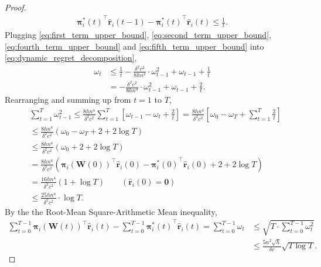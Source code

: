 \documentclass[10pt]{article}
\def\rvr{{\mathbf{r}}}
\def\rvzero{{\mathbf{0}}}
\def\rvpi{{\boldsymbol{\pi}}}
\def\rmW{{\mathbf{W}}}
\begin{document}
\begin{proof}
\begin{equation}
\label{eq:fifth_term_upper_bound}
\begin{split}
    {\rvpi_i^*(t)}^\top \hat{\rvr}_i(t-1) - {\rvpi_i^*(t)}^\top \hat{\rvr}_i(t) \le \frac{1}{t}.
\end{split}
\end{equation}
Plugging \cref{eq:first_term_upper_bound}, \cref{eq:second_term_upper_bound}, \cref{eq:fourth_term_upper_bound} and \cref{eq:fifth_term_upper_bound} into \cref{eq:dynamic_regret_decomposition},
\begin{equation*}
\begin{split}
    \omega_t &\le \frac{1}{t} - \frac{\delta^2 c^2}{8 h n^4} \cdot \omega_{t-1}^2 + \omega_{t-1} + \frac{1}{t} \\
    &= - \frac{\delta^2 c^2}{8 h n^4} \cdot \omega_{t-1}^2 + \omega_{t-1} + \frac{2}{t}.
\end{split}
\end{equation*}
Rearranging and summing up from $t = 1$ to $T$,
\begin{equation*}
\begin{split}
    &\sum\limits_{t=1}^{T}{ \omega_{t-1}^2 } \le \frac{8 h n^4}{\delta^2 c^2} \sum\limits_{t=1}^{T}{\left[ \omega_{t-1} - \omega_t + \frac{2}{t} \right]} = \frac{8 h n^4}{\delta^2 c^2} \left[ \omega_0 - \omega_T + \sum\limits_{t=1}^{T}{\frac{2}{t}} \right] \\
    &\le \frac{8 h n^4}{\delta^2 c^2} \left( \omega_0 - \omega_T + 2 + 2 \log{T} \right) \\
    &\le \frac{8 h n^4}{\delta^2 c^2} \left( \omega_0 + 2 + 2 \log{T} \right) \\
    &= \frac{8 h n^4}{\delta^2 c^2} \left( \rvpi_i\left(\rmW(0)\right)^\top \hat{\rvr}_i(0) - {\rvpi_i^*(0)}^\top \hat{\rvr}_i(0) + 2 + 2 \log{T} \right) \\
    &= \frac{16 h n^4}{\delta^2 c^2} \left( 1 + \log{T} \right) \qquad \left( \hat{\rvr}_i(0) = \rvzero \right) \\
    &\le \frac{25 h n^4}{\delta^2 c^2} \cdot \log{T}.
\end{split}
\end{equation*}
By the the Root-Mean Square-Arithmetic Mean inequality,
\begin{equation}
\label{eq:dynamic_regret_upper_bound}
\begin{split}
    \sum\limits_{t=0}^{T-1}{ \rvpi_i\left(\rmW(t)\right)^\top \hat{\rvr}_i(t)} - \sum\limits_{t=0}^{T-1}{ {\rvpi_i^*(t)}^\top \hat{\rvr}_i(t)} = \sum\limits_{t=0}^{T-1}{ \omega_t } &\le \sqrt{ T \cdot \sum\limits_{t=0}^{T-1}{ \omega_{t}^2 } } \\
    &\le \frac{5 n^2 \sqrt{h}}{\delta c}\sqrt{T \log{T}}.
\end{split}
\end{equation}
\end{proof}
\end{document}
